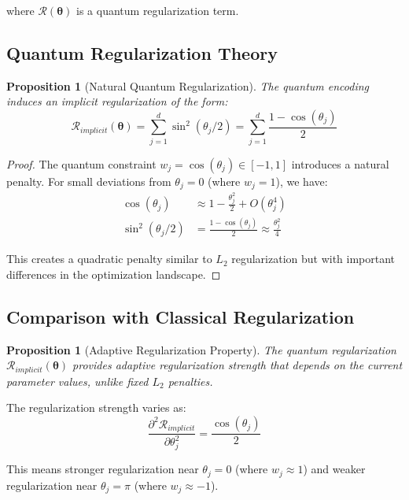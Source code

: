\documentclass[11pt]{article}
\newtheorem{proposition}[theorem]{Proposition}
\begin{document}
where $\mathcal{R}(\bm{\theta})$ is a quantum regularization term.

\subsection{Quantum Regularization Theory}

\begin{proposition}[Natural Quantum Regularization]
The quantum encoding induces an implicit regularization of the form:
\begin{equation}
\mathcal{R}_{implicit}(\bm{\theta}) = \sum_{j=1}^d \sin^2(\theta_j/2) = \sum_{j=1}^d \frac{1 - \cos(\theta_j)}{2}
\label{eq:implicit_regularization}
\end{equation}
\end{proposition}

\begin{proof}
The quantum constraint $w_j = \cos(\theta_j) \in [-1,1]$ introduces a natural penalty. For small deviations from $\theta_j = 0$ (where $w_j = 1$), we have:
\begin{align}
\cos(\theta_j) &\approx 1 - \frac{\theta_j^2}{2} + O(\theta_j^4) \\
\sin^2(\theta_j/2) &= \frac{1 - \cos(\theta_j)}{2} \approx \frac{\theta_j^2}{4}
\end{align}

This creates a quadratic penalty similar to $L_2$ regularization but with important differences in the optimization landscape.
\end{proof}

\subsection{Comparison with Classical Regularization}

\begin{proposition}[Adaptive Regularization Property]
The quantum regularization $\mathcal{R}_{implicit}(\bm{\theta})$ provides adaptive regularization strength that depends on the current parameter values, unlike fixed $L_2$ penalties.
\end{proposition}

The regularization strength varies as:
\begin{equation}
\frac{\partial^2 \mathcal{R}_{implicit}}{\partial \theta_j^2} = \frac{\cos(\theta_j)}{2}
\end{equation}

This means stronger regularization near $\theta_j = 0$ (where $w_j \approx 1$) and weaker regularization near $\theta_j = \pi$ (where $w_j \approx -1$).
\end{document}
